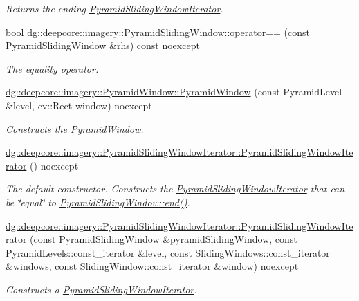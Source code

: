 \begin{DoxyCompactItemize}
\begin{DoxyCompactList}\small\item\em Returns the ending \hyperlink{classdg_1_1deepcore_1_1imagery_1_1_pyramid_sliding_window_iterator}{Pyramid\+Sliding\+Window\+Iterator}. \end{DoxyCompactList}\item 
bool \hyperlink{group___imagery_module_ga1b88dd8ec7d6e4c9841dfa93b64c763e}{dg\+::deepcore\+::imagery\+::\+Pyramid\+Sliding\+Window\+::operator==} (const Pyramid\+Sliding\+Window \&rhs) const noexcept
\begin{DoxyCompactList}\small\item\em The equality operator. \end{DoxyCompactList}\item 
\hyperlink{group___imagery_module_ga96c7cf53df8e5ca33d62bc9ec25215b5}{dg\+::deepcore\+::imagery\+::\+Pyramid\+Window\+::\+Pyramid\+Window} (const Pyramid\+Level \&level, cv\+::\+Rect window) noexcept
\begin{DoxyCompactList}\small\item\em Constructs the \hyperlink{structdg_1_1deepcore_1_1imagery_1_1_pyramid_window}{Pyramid\+Window}. \end{DoxyCompactList}\item 
\hyperlink{group___imagery_module_gacbd11cb149d2263770674f86d6595617}{dg\+::deepcore\+::imagery\+::\+Pyramid\+Sliding\+Window\+Iterator\+::\+Pyramid\+Sliding\+Window\+Iterator} () noexcept
\begin{DoxyCompactList}\small\item\em The default constructor. Constructs the \hyperlink{classdg_1_1deepcore_1_1imagery_1_1_pyramid_sliding_window_iterator}{Pyramid\+Sliding\+Window\+Iterator} that can be \char`\"{}equal\char`\"{} to \hyperlink{group___imagery_module_gaf39101c886a6ca5194201848f7d6d831}{Pyramid\+Sliding\+Window\+::end()}. \end{DoxyCompactList}\item 
\hyperlink{group___imagery_module_gaba595bfc1790d917eaa28c1533afa2ad}{dg\+::deepcore\+::imagery\+::\+Pyramid\+Sliding\+Window\+Iterator\+::\+Pyramid\+Sliding\+Window\+Iterator} (const Pyramid\+Sliding\+Window \&pyramid\+Sliding\+Window, const Pyramid\+Levels\+::const\+\_\+iterator \&level, const Sliding\+Windows\+::const\+\_\+iterator \&windows, const Sliding\+Window\+::const\+\_\+iterator \&window) noexcept
\begin{DoxyCompactList}\small\item\em Constructs a \hyperlink{classdg_1_1deepcore_1_1imagery_1_1_pyramid_sliding_window_iterator}{Pyramid\+Sliding\+Window\+Iterator}. \end{DoxyCompactList}\item 

\end{DoxyCompactItemize}
